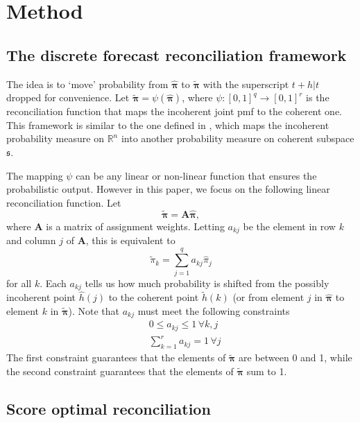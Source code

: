 \documentclass[a4paper,review,12pt,authoryear]{elsarticle}
\newcommand{\bpi}{\bm{\pi}}
\begin{document}
  \section{Method}
  \label{sec:method}
  
      \subsection{The discrete forecast reconciliation framework}
      
      The idea is to `move' probability from $\hat{\bpi}$ to $\tilde{\bpi}$ with the superscript $t+h|t$ dropped for convenience.  
      Let $\tilde{\bpi} = \psi(\hat{\bpi})$, where $\psi:[0,1]^q \rightarrow [0,1]^r$ is the reconciliation function that maps the incoherent joint pmf to the coherent one. 
      This framework is similar to the one defined in \cite{panagiotelisProbabilisticForecastReconciliation2022}, which maps the incoherent probability measure on $\mathbb{R}^n$ into another probability measure on coherent subspace $\mathfrak{s}$.
  
      The mapping $\psi$ can be any linear or non-linear function that ensures the probabilistic output. 
      However in this paper, we focus on the following linear reconciliation function.
      Let
      \begin{equation}
        \label{eq:framework}
      \tilde{\bpi}=\bm{A}\hat{\bpi},
      \end{equation}
      where $\bm{A}$ is a matrix of assignment weights. Letting $a_{kj}$ be the element in row $k$ and column $j$ of $\bm{A}$, this is equivalent to
      \[
        \tilde{\pi}_k=\sum\limits_{j=1}^q a_{kj}\hat{{\pi}}_j
      \]
      for all $k$. 
      Each $a_{kj}$ tells us how much probability is shifted from the possibly incoherent point $\hat{h}(j)$ to the coherent point $\tilde{h}(k)$ (or from element $j$ in $\hat{\bpi}$ to element $k$ in $\tilde{\bpi}$). Note that $a_{kj}$ must meet the following constraints
      \begin{align*}
      &0\leq a_{kj} \leq 1 \,\forall k, j\\ 
      &\sum\limits_{k=1}^r a_{kj} = 1 \,\forall j 
      \end{align*}
      The first constraint guarantees that the elements of $\tilde{\bpi}$ are between 0 and 1, while the second constraint guarantees that the elements of $\tilde{\bpi}$ sum to 1.
      
      \subsection{Score optimal reconciliation}
\end{document}
